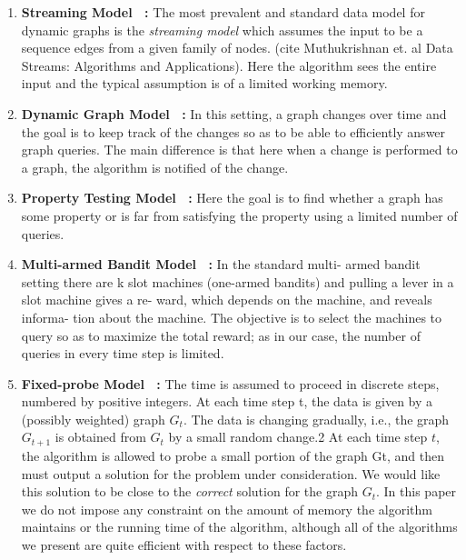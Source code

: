\begin{enumerate}
	\item {\textbf{Streaming Model~\cite{muthukrishnan2005data} :}} The most prevalent and standard data model for dynamic graphs is the \emph{streaming model} which assumes the input to be a sequence edges from a given family of nodes. (cite Muthukrishnan et. al Data Streams: Algorithms and Applications). Here the algorithm sees the entire input and the typical assumption is of a limited working memory. 

	
	
	\item {\textbf{Dynamic Graph Model~\cite{demetrescu_algorithms_2010} :}} In this setting, a graph changes over time and the goal is to keep track of the changes so as to be able to efficiently answer graph queries. The main difference is that here when a change is performed to a graph, the algorithm is notified of the change.


	\item {\textbf{Property Testing Model~\cite{ron_algorithmic_2010} :}}  Here the goal is to find whether a graph has some property or is far from satisfying the property using a limited number of queries. 

	\item {\textbf{Multi-armed Bandit Model~\cite{muthukrishnan2005data} :}}  In the standard multi- armed bandit setting there are k slot machines (one-armed bandits) and pulling a lever in a slot machine gives a re- ward, which depends on the machine, and reveals informa- tion about the machine. The objective is to select the machines to query so as to maximize the total reward; as in our case, the number of queries in every time step is limited. 

	\item {\textbf{Fixed-probe Model~\cite{anagnostopoulos_algorithms_2012} :}} The time is assumed to proceed in discrete steps, numbered by positive integers. At each time step t, the data is given by a (possibly weighted) graph $G_t$. The data is changing gradually, i.e., the graph $G_{t+1}$ is obtained from $G_t$ by a small random change.2 At each time step $t$, the algorithm is allowed to probe a small portion of the graph Gt, and then must output a solution for the problem under consideration. We would like this solution to be close to the  \emph{correct} solution for the graph $G_t$. In this paper we do not impose any constraint on the amount of memory the algorithm maintains or the running time of the algorithm, although all of the algorithms we present are quite efficient with respect to these factors.


\end{enumerate}
